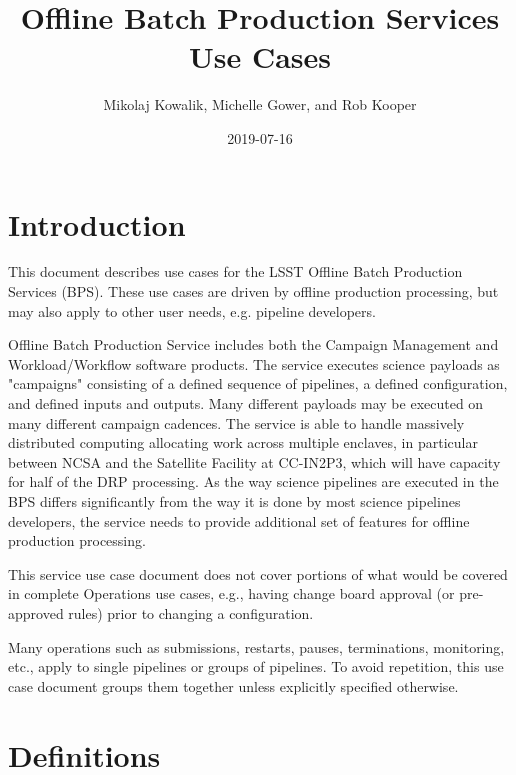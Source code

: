 \documentclass[DM,toc]{lsstdoc}
\title{Offline Batch Production Services Use Cases}
\author{Mikolaj Kowalik, Michelle Gower, and Rob Kooper}
\date{2019-07-16}
\begin{document}
\maketitle

\section{Introduction}

This document describes use cases for the LSST Offline Batch Production
Services (BPS).  These use cases are driven by offline production
processing, but may also apply to other user needs, e.g. pipeline
developers.

Offline Batch Production Service includes both the Campaign Management and
Workload/Workflow software products.  The service executes science payloads as
"campaigns" consisting of a defined sequence of pipelines, a defined
configuration, and defined inputs and outputs.  Many different payloads may be
executed on many different campaign cadences.  The service is able to handle
massively distributed computing allocating work across multiple enclaves, in
particular between NCSA and the Satellite Facility at CC-IN2P3, which will have
capacity for half of the DRP processing.  As the way science pipelines are
executed in the BPS differs significantly from the way it is done by most
science pipelines developers, the service needs to provide additional set of
features for offline production processing.

This service use case document does not cover portions of what would be
covered in complete Operations use cases, e.g., having change board
approval (or pre-approved rules) prior to changing a configuration.    

Many operations such as submissions, restarts, pauses, terminations,
monitoring, etc., apply to single pipelines or groups of pipelines.  To avoid
repetition, this use case document groups them together unless explicitly
specified otherwise.

\section{Definitions}
\end{document}
